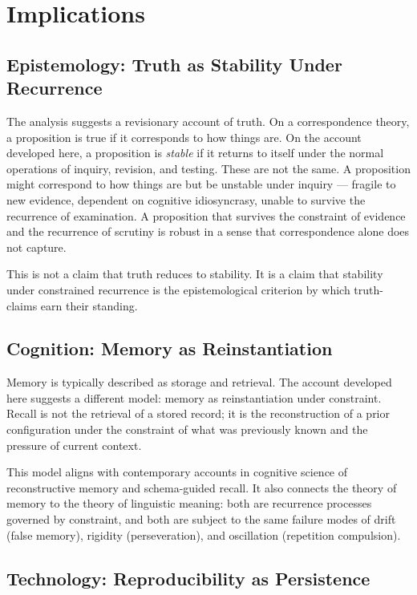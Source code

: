 \documentclass[12pt, oneside]{article}
\theoremstyle{definition}
\theoremstyle{remark}
\begin{document}
\section{Implications}

\subsection{Epistemology: Truth as Stability Under Recurrence}

The analysis suggests a revisionary account of truth.
On a correspondence theory, a proposition is true if it corresponds to how things are.
On the account developed here, a proposition is \emph{stable} if it returns to itself under the normal operations of inquiry, revision, and testing.
These are not the same.
A proposition might correspond to how things are but be unstable under inquiry --- fragile to new evidence, dependent on cognitive idiosyncrasy, unable to survive the recurrence of examination.
A proposition that survives the constraint of evidence and the recurrence of scrutiny is robust in a sense that correspondence alone does not capture.

This is not a claim that truth reduces to stability.
It is a claim that stability under constrained recurrence is the epistemological criterion by which truth-claims earn their standing.

\subsection{Cognition: Memory as Reinstantiation}

Memory is typically described as storage and retrieval.
The account developed here suggests a different model: memory as reinstantiation under constraint.
Recall is not the retrieval of a stored record; it is the reconstruction of a prior configuration under the constraint of what was previously known and the pressure of current context.

This model aligns with contemporary accounts in cognitive science of reconstructive memory and schema-guided recall.
It also connects the theory of memory to the theory of linguistic meaning: both are recurrence processes governed by constraint, and both are subject to the same failure modes of drift (false memory), rigidity (perseveration), and oscillation (repetition compulsion).

\subsection{Technology: Reproducibility as Persistence}
\end{document}
